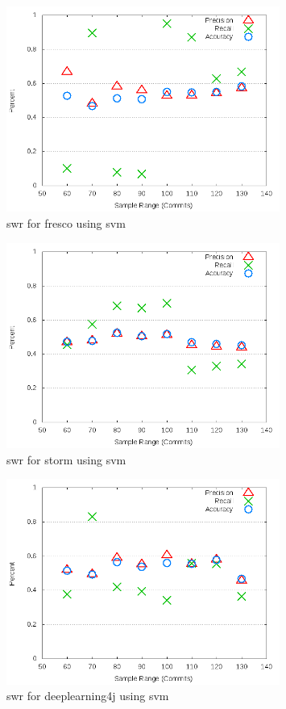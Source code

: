 \begin{figure}[!ht]
    \centering
        \includegraphics[width=0.8\textwidth]{images/svm/test_1/fresco_sample_range}
        \caption{\gls{swr} for fresco using \gls{svm}}
        \label{fig:test_1_fresco_svm}
\end{figure}

\begin{figure}[!ht]
    \centering
        \includegraphics[width=0.8\textwidth]{images/svm/test_1/storm_sample_range}
        \caption{\gls{swr} for storm using \gls{svm}}
        \label{fig:test_1_storm_svm}
\end{figure}

\begin{figure}[h]
    \centering
        \includegraphics[width=0.8\textwidth]{images/svm/test_1/deeplearning4j_sample_range}
    \caption{\gls{swr} for deeplearning4j using \gls{svm}}
    \label{fig:test_1_deeplearning4j_svm}
\end{figure}

